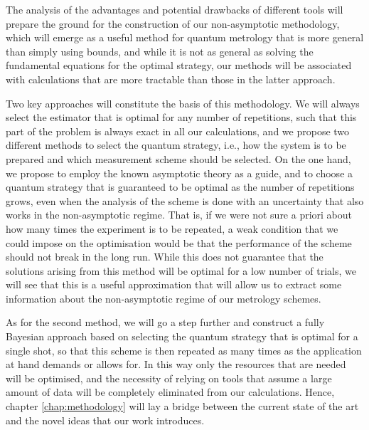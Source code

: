 The analysis of the advantages and potential drawbacks of different tools will prepare the ground for the construction of our non-asymptotic methodology, which will emerge as a useful method for quantum metrology that is more general than simply using bounds, and while it is not as general as solving the fundamental equations for the optimal strategy, our methods will be associated with calculations that are more tractable than those in the latter approach. 

Two key approaches will constitute the basis of this methodology. We will always select the estimator that is optimal for any number of repetitions, such that this part of the problem is always exact in all our calculations, and we propose two different methods to select the quantum strategy, i.e., how the system is to be prepared and which measurement scheme should be selected. On the one hand, we propose to employ the known asymptotic theory as a guide, and to choose a quantum strategy that is guaranteed to be optimal as the number of repetitions grows, even when the analysis of the scheme is done with an uncertainty that also works in the non-asymptotic regime. That is, if we were not sure a priori about how many times the experiment is to be repeated, a weak condition that we could impose on the optimisation would be that the performance of the scheme should not break in the long run. While this does not guarantee that the solutions arising from this method will be optimal for a low number of trials, we will see that this is a useful approximation that will allow us to extract some information about the non-asymptotic regime of our metrology schemes.

As for the second method, we will go a step further and construct a fully Bayesian approach based on selecting the quantum strategy that is optimal for a single shot, so that this scheme is then repeated as many times as the application at hand demands or allows for. In this way only the resources that are needed will be optimised, and the necessity of relying on tools that assume a large amount of data will be completely eliminated from our calculations. Hence, chapter \ref{chap:methodology} will lay a bridge between the current state of the art and the novel ideas that our work introduces. 


